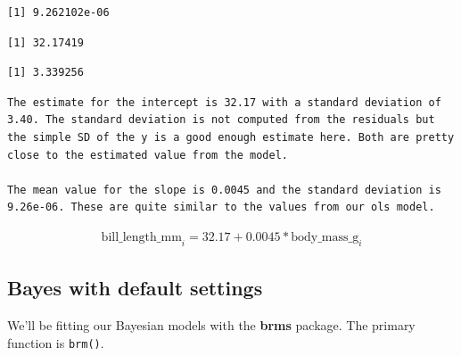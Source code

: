 \documentclass[
  letterpaper,
  DIV=11,
  numbers=noendperiod]{scrartcl}
\newenvironment{Shaded}{\begin{snugshade}}{\end{snugshade}}
\newcommand{\CommentTok}[1]{\textcolor[rgb]{0.37,0.37,0.37}{#1}}
\newcommand{\FunctionTok}[1]{\textcolor[rgb]{0.28,0.35,0.67}{#1}}
\newcommand{\NormalTok}[1]{\textcolor[rgb]{0.00,0.23,0.31}{#1}}
\newcommand{\SpecialCharTok}[1]{\textcolor[rgb]{0.37,0.37,0.37}{#1}}
\begin{document}
\begin{verbatim}
[1] 9.262102e-06
\end{verbatim}

\begin{Shaded}
\end{Shaded}

\begin{verbatim}
[1] 32.17419
\end{verbatim}

\begin{Shaded}
\end{Shaded}

\begin{verbatim}
[1] 3.339256
\end{verbatim}

\begin{verbatim}
The estimate for the intercept is 32.17 with a standard deviation of 3.40. The standard deviation is not computed from the residuals but the simple SD of the y is a good enough estimate here. Both are pretty close to the estimated value from the model.

The mean value for the slope is 0.0045 and the standard deviation is 9.26e-06. These are quite similar to the values from our ols model.
\end{verbatim}

\[
\begin{align}
\text{bill_length_mm}_i = 32.17 + 0.0045 * \text{body_mass_g}_i
\end{align}
\]

\subsection{Bayes with default
settings}\label{bayes-with-default-settings}

We'll be fitting our Bayesian models with the \textbf{brms} package. The
primary function is \texttt{brm()}.
\end{document}
